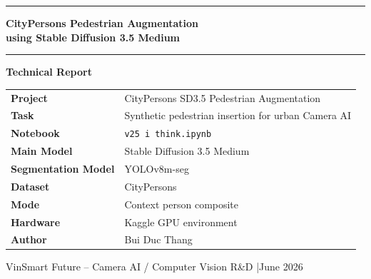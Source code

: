 \documentclass[12pt,a4paper]{article}
\begin{document}
\begin{titlepage}
    \centering
    \vspace*{2cm}

    {\color{primaryblue}\rule{\linewidth}{2pt}}
    \vspace{0.5cm}

    {\Huge\bfseries\color{primaryblue}
        CityPersons Pedestrian Augmentation\\[6pt]
        using Stable Diffusion 3.5 Medium
    }

    \vspace{0.5cm}
    {\color{primaryblue}\rule{\linewidth}{2pt}}

    \vspace{1.5cm}

    {\Large\bfseries Technical Report}

    \vspace{1cm}

    \begin{tabular}{ll}
        \textbf{Project}    & CityPersons SD3.5 Pedestrian Augmentation \\[4pt]
        \textbf{Task}       & Synthetic pedestrian insertion for urban Camera AI \\[4pt]
        \textbf{Notebook}   & \texttt{v25 i think.ipynb} \\[4pt]
        \textbf{Main Model} & Stable Diffusion 3.5 Medium \\[4pt]
        \textbf{Segmentation Model} & YOLOv8m-seg \\[4pt]
        \textbf{Dataset}    & CityPersons \\[4pt]
        \textbf{Mode}       & Context person composite \\[4pt]
        \textbf{Hardware}   & Kaggle GPU environment \\[4pt]
        \textbf{Author}     & Bui Duc Thang \\
    \end{tabular}

    \vfill

    {\small\color{gray}
    VinSmart Future -- Camera AI / Computer Vision R\&D \quad|\quad June 2026
    }

\end{titlepage}

\tableofcontents
\clearpage
\end{document}
